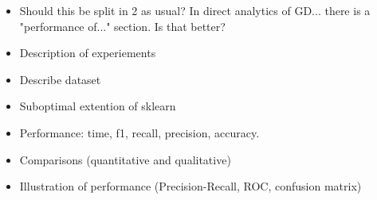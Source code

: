 
\begin{itemize}
    \item Should this be split in 2 as usual? In direct analytics of GD... there is a "performance of..." section. Is that better? 
    \item Description of experiements  
    \item Describe dataset 
    \item Suboptimal extention of sklearn
    \item Performance: time, f1, recall, precision, accuracy. 
    \item Comparisons (quantitative and qualitative)
    \item Illustration of performance (Precision-Recall, ROC, confusion matrix)
\end{itemize}